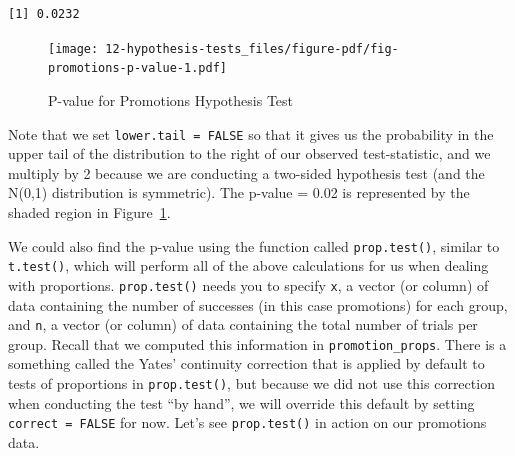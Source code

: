 \documentclass[
  letterpaper,
  DIV=11,
  numbers=noendperiod]{scrreprt}
\newenvironment{Shaded}{\begin{snugshade}}{\end{snugshade}}
\newcommand{\AttributeTok}[1]{\textcolor[rgb]{0.40,0.45,0.13}{#1}}
\newcommand{\ConstantTok}[1]{\textcolor[rgb]{0.56,0.35,0.01}{#1}}
\newcommand{\FunctionTok}[1]{\textcolor[rgb]{0.28,0.35,0.67}{#1}}
\newcommand{\NormalTok}[1]{\textcolor[rgb]{0.00,0.23,0.31}{#1}}
\newcommand{\OtherTok}[1]{\textcolor[rgb]{0.00,0.23,0.31}{#1}}
\newcommand{\SpecialCharTok}[1]{\textcolor[rgb]{0.37,0.37,0.37}{#1}}
\theoremstyle{definition}
\theoremstyle{remark}
\begin{document}
\begin{verbatim}
[1] 0.0232
\end{verbatim}

\begin{figure}

{\centering \texttt{[image: 12-hypothesis-tests\_files/figure-pdf/fig-promotions-p-value-1.pdf]}

}

\caption{\label{fig-promotions-p-value}P-value for Promotions Hypothesis
Test}

\end{figure}

Note that we set \texttt{lower.tail\ =\ FALSE} so that it gives us the
probability in the upper tail of the distribution to the right of our
observed test-statistic, and we multiply by 2 because we are conducting
a two-sided hypothesis test (and the N(0,1) distribution is symmetric).
The p-value = 0.02 is represented by the shaded region in
Figure~\ref{fig-promotions-p-value}.

We could also find the p-value using the function called
\texttt{prop.test()}, similar to \texttt{t.test()}, which will perform
all of the above calculations for us when dealing with proportions.
\texttt{prop.test()} needs you to specify \texttt{x}, a vector (or
column) of data containing the number of successes (in this case
promotions) for each group, and \texttt{n}, a vector (or column) of data
containing the total number of trials per group. Recall that we computed
this information in \texttt{promotion\_props}. There is a something
called the Yates' continuity correction that is applied by default to
tests of proportions in \texttt{prop.test()}, but because we did not use
this correction when conducting the test ``by hand'', we will override
this default by setting \texttt{correct\ =\ FALSE} for now. Let's see
\texttt{prop.test()} in action on our promotions data.

\begin{Shaded}
\end{Shaded}
\end{document}
